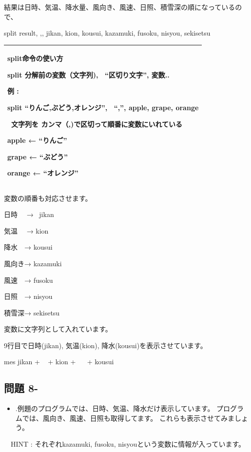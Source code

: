 \documentclass[a4paper,12pt,dvipdfmx]{jarticle}
\newcounter{Question}
\renewcommand\theQuestion{\textbf{問題 8-\arabic{Question}}}
\begin{document}
結果は日時、気温、降水量、風向き、風速、日照、積雪深の順になっているので、

split result, {\textquotedbl},{\textquotedbl}, jikan, kion, kousui, kazamuki, fusoku, nisyou, sekisetsu


\bigskip

\begin{center}
\tablefirsthead{}
\tablehead{}
\tabletail{}
\tablelasttail{}
\begin{supertabular}{|m{16.806cm}|}
\hline
split命令の使い方

split 分解前の変数（文字列), \ “区切り文字”,
変数..

例 :

split “りんご,ぶどう,オレンジ”, \ “,”, apple, grape, orange

\ 文字列を
カンマ（,)で区切って順番に変数にいれている

apple ← “りんご”

grape ← “ぶどう”

orange ← “オレンジ”\\\hline
\end{supertabular}
\end{center}

\bigskip


\bigskip

変数の順番も対応させます。

日時 　→ \ jikan

気温　 → kion 　

降水　→ kousui

風向き→ kazamuki

風速　→ fusoku

日照　→ nisyou

積雪深→ sekisetsu

変数に文字列として入れています。


\bigskip

9行目で日時(jikan), 気温(kion),
降水(kousui)を表示させています。

mes jikan + {\textquotedbl} \ {\textquotedbl} + kion + {\textquotedbl} \ \ {\textquotedbl} + kousui

\clearpage\subsection*{\theQuestion}
\begin{itemize}
\item
.例題のプログラムでは、日時、気温、降水だけ表示しています。
		プログラムでは、風向き、風速、日照も取得してます。
		これらも表示させてみましょう。
\end{itemize}
\ \ HINT : それぞれkazamuki, fusoku,
nisyouという変数に情報が入っています。
\end{document}
